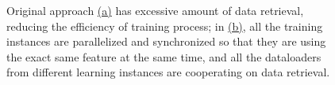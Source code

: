 \documentclass[conference]{IEEEtran}
\begin{document}
\begin{figure}[!htb] 
	
	
	\caption{\small 
		Original approach \hyperref[dl_a]{(a)} has excessive amount of data retrieval, reducing the efficiency of training process; 
		in \hyperref[dl_b]{(b)}, all the training instances are parallelized and synchronized so that they are using the exact same feature at the same time, and all the dataloaders from different learning instances are cooperating on data retrieval. }
	\label{fig:dl}
\end{figure}
\end{document}
